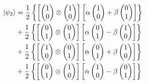 \begin{equation}\label{eq:final}
  \begin{split}
\ket{\psi_2} &=\frac{1}{2} \left\{ \left[\begin{pmatrix}
1 \\
0
\end{pmatrix} \otimes \begin{pmatrix}
1 \\
0
\end{pmatrix}\right] \left[\alpha \begin{pmatrix}
1 \\
0
\end{pmatrix} + \beta \begin{pmatrix}
0 \\
1
\end{pmatrix}\right]\right\} \nonumber \\
&+\frac{1}{2} \left\{ \left[\begin{pmatrix}
0 \\
1
\end{pmatrix} \otimes \begin{pmatrix}
0 \\
1
\end{pmatrix}\right] \left[\alpha \begin{pmatrix}
0 \\
1
\end{pmatrix} - \beta \begin{pmatrix}
1 \\
0
\end{pmatrix}\right]\right\} \nonumber \\
&+\frac{1}{2} \left\{\left[ \begin{pmatrix}
1 \\
0
\end{pmatrix} \otimes \begin{pmatrix}
0 \\
1
\end{pmatrix}\right] \left[\alpha \begin{pmatrix}
0 \\
1
\end{pmatrix} + \beta \begin{pmatrix}
1 \\
0
\end{pmatrix}\right]\right\} \nonumber \\
&+\frac{1}{2} \left\{ \left[ \begin{pmatrix}
0 \\
1
\end{pmatrix} \otimes \begin{pmatrix}
1 \\
0
\end{pmatrix}\right] \left[\alpha \begin{pmatrix}
1 \\
0
\end{pmatrix} - \beta \begin{pmatrix}
0 \\
1
\end{pmatrix}\right] \right\}
  \end{split}
\end{equation}

